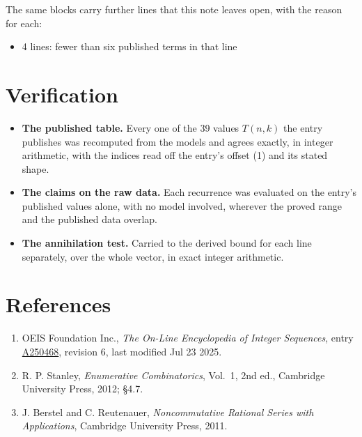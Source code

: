 \documentclass[11pt]{article}
\theoremstyle{definition}
\begin{document}
The same blocks carry further lines that this note leaves open, with the reason for each:

\begin{itemize}

\item 4 lines: fewer than six published terms in that line

\end{itemize}

\section{Verification}

\begin{itemize}

\item {\bfseries The published table.} Every one of the 39 values $T(n,k)$ the entry publishes was recomputed from the models and agrees exactly, in integer arithmetic, with the indices read off the entry's offset (1) and its stated shape.

\item {\bfseries The claims on the raw data.} Each recurrence was evaluated on the entry's published values alone, with no model involved, wherever the proved range and the published data overlap.

\item {\bfseries The annihilation test.} Carried to the derived bound for each line separately, over the whole vector, in exact integer arithmetic.

\end{itemize}

\section{References}

\begin{enumerate}

\item OEIS Foundation Inc., \emph{The On-Line Encyclopedia of Integer Sequences}, entry \href{https://oeis.org/A250468}{A250468}, revision 6, last modified Jul 23 2025.

\item R. P. Stanley, \emph{Enumerative Combinatorics}, Vol.~1, 2nd ed., Cambridge University Press, 2012; \S4.7.

\item J. Berstel and C. Reutenauer, \emph{Noncommutative Rational Series with Applications}, Cambridge University Press, 2011.

\end{enumerate}
\end{document}
